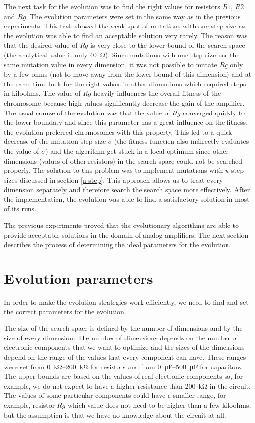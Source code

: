 The next task for the evolution was to find the right values for resistors $R1$, $R2$ and $Rg$. The evolution parameters were set in the same way as in the previous experiments. This task showed the weak spot of mutations with one step size as the evolution was able to find an acceptable solution very rarely. The reason was that the desired value of $Rg$ is very close to the lower bound of the search space (the analytical value is only \SI{40}{\ohm}). Since mutations with one step size use the same mutation value in every dimension, it was not possible to mutate $Rg$ only by a few ohms (not to move away from the lower bound of this dimension) and at the same time look for the right values in other dimensions which required steps in kiloohms. The value of $Rg$ heavily influences the overall fitness of the chromosome because high values significantly decrease the gain of the amplifier. The usual course of the evolution was that the value of $Rg$ converged quickly to the lower boundary and since this parameter has a great influence on the fitness, the evolution preferred chromosomes with this property. This led to a quick decrease of the mutation step size $\sigma$ (the fitness function also indirectly evaluates the value of $\sigma$) and the algorithm got stuck in a local optimum since other dimensions (values of other resistors) in the search space could not be searched properly. The solution to this problem was to implement mutations with $n$ step sizes discussed in section \ref{n-step}. This approach allows us to treat every dimension separately and therefore search the search space more effectively. After the implementation, the evolution was able to find a satisfactory solution in most of its runs.

The previous experiments proved that the evolutionary algorithms are able to provide acceptable solutions in the domain of analog amplifiers. The next section describes the process of determining the ideal parameters for the evolution.

\section{Evolution parameters}
In order to make the evolution strategies work efficiently, we need to find and set the correct parameters for the evolution.

The size of the search space is defined by the number of dimensions and by the size of every dimension. The number of dimensions depends on the number of electronic components that we want to optimize and the sizes of the dimensions depend on the range of the values that every component can have. These ranges were set from \SIrange{0}{200}{\kilo\ohm} for resistors and from \SIrange{0}{500}{\micro\farad} for capacitors. The upper bounds are based on the values of real electronic components so, for example, we do not expect to have a higher resistance than \SI{200}{\kilo\ohm} in the circuit. The values of some particular components could have a smaller range, for example, resistor $Rg$ which value does not need to be higher than a few kiloohms, but the assumption is that we have no knowledge about the circuit at all.

